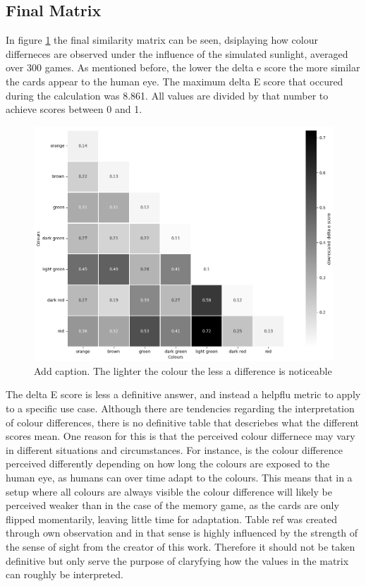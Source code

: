 \subsection{Final Matrix}
\label{final_matrix}
In figure \ref{fig:simMatrix} the final similarity matrix can be seen, dsiplaying how colour differneces are observed under the influence of the simulated sunlight, averaged over 300 games. As mentioned before, the lower the delta e score the more similar the cards appear to the human eye. The maximum delta E score that occured during the calculation was 8.861. All values are divided by that number to achieve scores between 0 and 1.
\begin{figure}[H]
	\centering
	\includegraphics[width=15cm]{images/simMatrixGrey.png}
	\caption[Bild kurz]{Add caption. The lighter the colour the less a difference is noticeable}
	\label{fig:simMatrix}
\end{figure}
The delta E score is less a definitive answer, and instead a helpflu metric to apply to a specific use case. Although there are tendencies regarding the interpretation of colour differences, there is no definitive table that descriebes what the different scores mean. One reason for this is that the perceived colour differnece may vary in different situations and circumstances. For instance, is the colour difference perceived differently depending on how long the colours are exposed to the human eye, as humans can over time adapt to the colours. This means that in a setup where all colours are always visible the colour difference will likely be perceived weaker than in the case of the memory game, as the cards are only flipped momentarily, leaving little time for adaptation. Table ref was created through own observation and in that sense is highly influenced by the strength of the sense of sight from the creator of this work. Therefore it should not be taken definitive but only serve the purpose of claryfying how the values in the matrix can roughly be interpreted.
